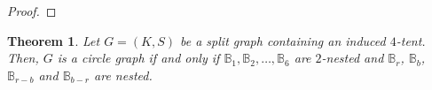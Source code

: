 \documentclass[12pt]{book}
\theoremstyle{plain}
\newtheorem{teo}{Theorem}[chapter]
\theoremstyle{remark}
\begin{document}
\begin{proof}
	
	
\end{proof}


\begin{teo} \label{teo:finalteo_4tent}
	Let $G=(K,S)$ be a split graph containing an induced $4$-tent. Then, $G$ is a circle graph if and only if $\mathbb B_1,\mathbb B_2,\ldots,\mathbb B_6$ are $2$-nested and $\mathbb B_r$, $\mathbb B_b$, $\mathbb B_{r-b}$ and $\mathbb B_{b-r}$ are nested.
\end{teo}
\end{document}
